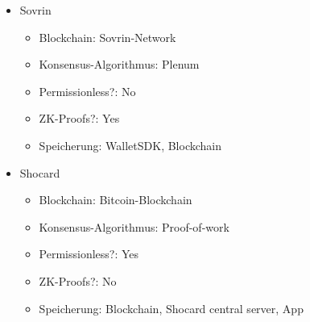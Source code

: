 \begin{itemize}
	\item Sovrin
	\begin{itemize}
		\item Blockchain: Sovrin-Network
		\item Konsensus-Algorithmus: Plenum
		\item Permissionless?: No
		\item ZK-Proofs?: Yes
		\item Speicherung: WalletSDK, Blockchain
	\end{itemize}
	
	\item Shocard
	\begin{itemize}
		\item Blockchain: Bitcoin-Blockchain
		\item Konsensus-Algorithmus: Proof-of-work
		\item Permissionless?: Yes
		\item ZK-Proofs?: No
		\item Speicherung: Blockchain, Shocard central server, App
	\end{itemize}
\end{itemize}



